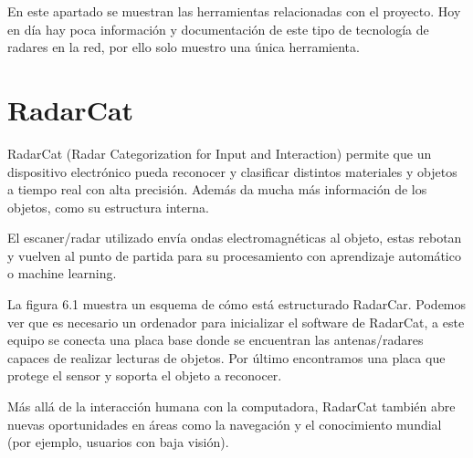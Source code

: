 
En este apartado se muestran las herramientas relacionadas con el proyecto.
Hoy en día hay poca información y documentación de este tipo de tecnología de radares en la red, por ello solo muestro una única herramienta.

\section{RadarCat}
RadarCat (Radar Categorization for Input and Interaction) permite que un dispositivo electrónico pueda reconocer y clasificar distintos materiales y objetos a tiempo real con alta precisión. Además da mucha más información de los objetos, como su estructura interna.

El escaner/radar utilizado envía ondas electromagnéticas al objeto, estas rebotan y vuelven al punto de partida para su procesamiento con aprendizaje automático o machine learning.

La figura 6.1 muestra un esquema de cómo está estructurado RadarCar. Podemos ver que es necesario un ordenador para inicializar el software de RadarCat, a este equipo se conecta una placa base donde se encuentran las antenas/radares capaces de realizar lecturas de objetos.
Por último encontramos una placa que protege el sensor y soporta el objeto a reconocer.


Más allá de la interacción humana con la computadora, RadarCat también abre nuevas oportunidades en áreas como la navegación y el conocimiento mundial (por ejemplo, usuarios con baja visión).